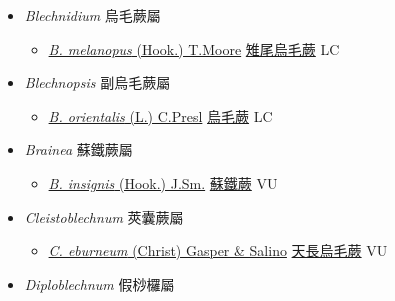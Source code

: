 
  \begin{itemize}
 \item[] \textit{Blechnidium} 烏毛蕨屬
                    
  \begin{itemize}
        \item[] \href{http://www.theplantlist.org/tpl1.1/search?q=Blechnidium+melanopus}{\textit{B. melanopus} (Hook.) T.Moore}     \href{\detokenize{http://taibnet.sinica.edu.tw/chi/taibnet_species_list.php?T2=雉尾烏毛蕨&T2_new_value=true&fr=y}}{雉尾烏毛蕨} LC
  \end{itemize}
 \item[] \textit{Blechnopsis} 副烏毛蕨屬
                    
  \begin{itemize}
        \item[] \href{http://www.theplantlist.org/tpl1.1/search?q=Blechnopsis+orientalis}{\textit{B. orientalis} (L.) C.Presl}     \href{\detokenize{http://taibnet.sinica.edu.tw/chi/taibnet_species_list.php?T2=烏毛蕨&T2_new_value=true&fr=y}}{烏毛蕨} LC
  \end{itemize}
 \item[] \textit{Brainea} 蘇鐵蕨屬
                    
  \begin{itemize}
        \item[] \href{http://www.theplantlist.org/tpl1.1/search?q=Brainea+insignis}{\textit{B. insignis} (Hook.) J.Sm.}   \href{\detokenize{http://taibnet.sinica.edu.tw/chi/taibnet_species_list.php?T2=蘇鐵蕨&T2_new_value=true&fr=y}}{蘇鐵蕨} VU
  \end{itemize}
 \item[] \textit{Cleistoblechnum} 莢囊蕨屬
                    
  \begin{itemize}
        \item[] \href{http://www.theplantlist.org/tpl1.1/search?q=Cleistoblechnum+eburneum}{\textit{C. eburneum} (Christ) Gasper \& Salino}     \href{\detokenize{http://taibnet.sinica.edu.tw/chi/taibnet_species_list.php?T2=天長烏毛蕨&T2_new_value=true&fr=y}}{天長烏毛蕨} VU
  \end{itemize}
 \item[] \textit{Diploblechnum} 假桫欏屬
                    

\end{itemize}
